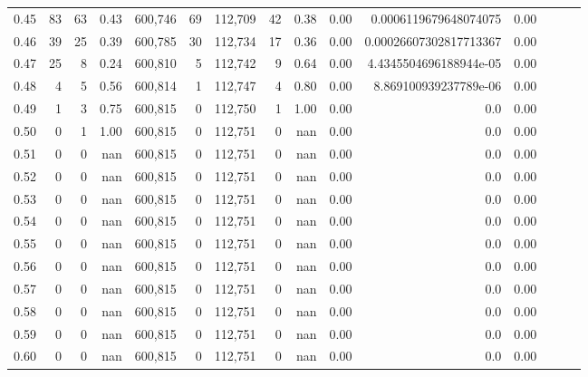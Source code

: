 \begin{tabular}{rrrrrrrrrrrrrrr}
0.45 &      83 &     63 &  0.43 &  600,746 &       69 &  112,709 &       42 &  0.38 &  0.00 &   0.0006119679648074075 &      0.00 \\
0.46 &      39 &     25 &  0.39 &  600,785 &       30 &  112,734 &       17 &  0.36 &  0.00 &  0.00026607302817713367 &      0.00 \\
0.47 &      25 &      8 &  0.24 &  600,810 &        5 &  112,742 &        9 &  0.64 &  0.00 &  4.4345504696188944e-05 &      0.00 \\
0.48 &       4 &      5 &  0.56 &  600,814 &        1 &  112,747 &        4 &  0.80 &  0.00 &   8.869100939237789e-06 &      0.00 \\
0.49 &       1 &      3 &  0.75 &  600,815 &        0 &  112,750 &        1 &  1.00 &  0.00 &                     0.0 &      0.00 \\
0.50 &       0 &      1 &  1.00 &  600,815 &        0 &  112,751 &        0 &   nan &  0.00 &                     0.0 &      0.00 \\
0.51 &       0 &      0 &   nan &  600,815 &        0 &  112,751 &        0 &   nan &  0.00 &                     0.0 &      0.00 \\
0.52 &       0 &      0 &   nan &  600,815 &        0 &  112,751 &        0 &   nan &  0.00 &                     0.0 &      0.00 \\
0.53 &       0 &      0 &   nan &  600,815 &        0 &  112,751 &        0 &   nan &  0.00 &                     0.0 &      0.00 \\
0.54 &       0 &      0 &   nan &  600,815 &        0 &  112,751 &        0 &   nan &  0.00 &                     0.0 &      0.00 \\
0.55 &       0 &      0 &   nan &  600,815 &        0 &  112,751 &        0 &   nan &  0.00 &                     0.0 &      0.00 \\
0.56 &       0 &      0 &   nan &  600,815 &        0 &  112,751 &        0 &   nan &  0.00 &                     0.0 &      0.00 \\
0.57 &       0 &      0 &   nan &  600,815 &        0 &  112,751 &        0 &   nan &  0.00 &                     0.0 &      0.00 \\
0.58 &       0 &      0 &   nan &  600,815 &        0 &  112,751 &        0 &   nan &  0.00 &                     0.0 &      0.00 \\
0.59 &       0 &      0 &   nan &  600,815 &        0 &  112,751 &        0 &   nan &  0.00 &                     0.0 &      0.00 \\
0.60 &       0 &      0 &   nan &  600,815 &        0 &  112,751 &        0 &   nan &  0.00 &                     0.0 &      0.00 \\

\end{tabular}
